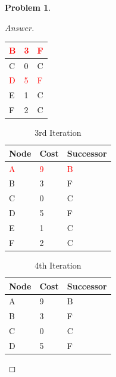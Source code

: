 \documentclass[11pt]{article}
\theoremstyle{definition}
\theoremstyle{definition}
\newtheorem{required}{Problem}
\theoremstyle{definition}
\begin{document}
\begin{required}
\begin{proof}[Answer]
\begin{table}[htp]
\begin{tabular}{|l|l|l|}
\hline
\textcolor{red}{B}                     & \textcolor{red}{3} & \textcolor{red}{F}  \\ 
\hline
C                                      & 0                  & C                   \\ 
\hline
\textcolor{red}{D}                     & \textcolor{red}{5} & \textcolor{red}{F}  \\ 
\hline
E                                      & 1                  & C                   \\ 
\hline
F                                      & 2                  & C                   \\
\hline
\end{tabular}
\end{table}
\begin{table}[htp]
\centering
\caption{3rd Iteration}
\begin{tabular}{|l|l|l|} 
\hline
\rowcolor[rgb]{0.753,0.753,0.753} Node & Cost               & Successor           \\ 
\hline
\textcolor{red}{A}                     & \textcolor{red}{9} & \textcolor{red}{B}  \\ 
\hline
B                                      & 3                  & F                   \\ 
\hline
C                                      & 0                  & C                   \\ 
\hline
D                                      & 5                  & F                   \\ 
\hline
E                                      & 1                  & C                   \\ 
\hline
F                                      & 2                  & C                   \\
\hline
\end{tabular}\end{table}
\begin{table}[htp]
\centering
\caption{4th Iteration}
\begin{tabular}{|l|l|l|} 
\hline
\rowcolor[rgb]{0.753,0.753,0.753} Node & Cost & Successor  \\ 
\hline
A                                      & 9    & B          \\ 
\hline
B                                      & 3    & F          \\ 
\hline
C                                      & 0    & C          \\ 
\hline
D                                      & 5    & F          \\ 

\end{tabular}
\end{table}
\end{proof}
\end{required}
\end{document}
